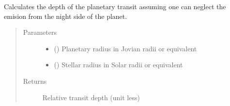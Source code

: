 \documentclass[a4paper,11pt,english]{sphinxmanual}
\begin{document}
\begin{fulllineitems}
\label{\detokenize{cascade.exoplanet_tools:cascade.exoplanet_tools.exoplanet_tools.TransitDepth}}
Calculates the depth of the planetary transit assuming one can
neglect the emision from the night side of the planet.
\begin{quote}\begin{description}
\item[{Parameters}] \leavevmode\begin{itemize}
\item {} 
 () \textendash{} Planetary radius in Jovian radii or equivalent

\item {} 
 () \textendash{} Stellar radius in Solar radii or equivalent

\end{itemize}

\item[{Returns}] \leavevmode
{} \textendash{} Relative transit depth (unit less)

\end{description}\end{quote}

\end{fulllineitems}

\end{document}
